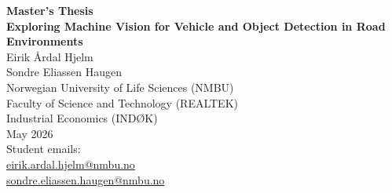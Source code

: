 \begin{titlepage}
    \centering
    \vspace*{1cm}

    {\Large \textbf{Master's Thesis}}\\[0.6cm]
    {\LARGE \textbf{Exploring Machine Vision for Vehicle and Object Detection in Road Environments}}\\[2cm]

    {\large
    Eirik Årdal Hjelm\\
    Sondre Eliassen Haugen
    }\\[1.5cm]

    {\large
    Norwegian University of Life Sciences (NMBU)\\
    Faculty of Science and Technology (REALTEK)\\
    Industrial Economics (INDØK)
    }\\[1.5cm]

    {\large
    May 2026
    }\\[2cm]

    {\small
    Student emails:\\
    \href{mailto:eirik.ardal.hjelm@nmbu.no}{eirik.ardal.hjelm@nmbu.no}\\
    \href{mailto:sondre.eliassen.haugen@nmbu.no}{sondre.eliassen.haugen@nmbu.no}
    }

    \vfill
\end{titlepage}

